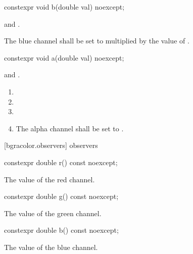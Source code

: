 \begin{itemdecl}
constexpr void b(double val) noexcept;
\end{itemdecl}
\begin{itemdescr}
\pnum
\requires
{} and .

\pnum
\effects
The blue channel shall be set to  multiplied by the value of  .
\end{itemdescr}

\begin{itemdecl}
constexpr void a(double val) noexcept;
\end{itemdecl}
\begin{itemdescr}
\pnum
\requires
{} and .

\pnum
\effects
\begin{enumerate}
\item {}
\item {}
\item {}
\item The alpha channel shall be set to .
\end{enumerate}
\end{itemdescr}

 [bgracolor.observers]{ observers}

\begin{itemdecl}
constexpr double r() const noexcept;
\end{itemdecl}
\begin{itemdescr}
\pnum
\returns
The value of the red channel.
\end{itemdescr}

\begin{itemdecl}
constexpr double g() const noexcept;
\end{itemdecl}
\begin{itemdescr}
\pnum
\returns
The value of the green channel.
\end{itemdescr}

\begin{itemdecl}
constexpr double b() const noexcept;
\end{itemdecl}
\begin{itemdescr}
\pnum
\returns
The value of the blue channel.
\end{itemdescr}

